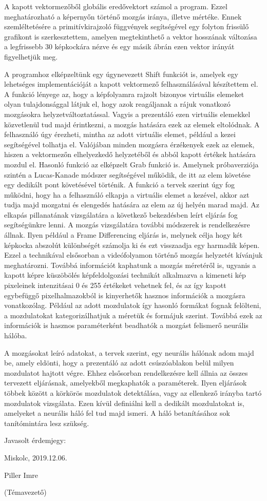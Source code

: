 \documentclass[a4paper]{article}
\begin{document}
A kapott vektormezőből globális eredővektort számol a program. Ezzel meghatározható a képernyőn történő mozgás iránya, illetve mértéke. Ennek szemléltetésére a primitívkirajzoló függvények segítségével egy folyton frissülő grafikont is szerkesztettem, amelyen megtekinthető a vektor hosszának változása a legfrissebb 30 képkockára nézve és egy másik ábrán ezen vektor irányát figyelhetjük meg.

A programhoz elképzeltünk egy úgynevezett Shift funkciót is, amelyek egy lehetséges implementációját a kapott vektormező felhasználásával készítettem el. A funkció lényege az, hogy a képfolyamra rajzolt bizonyos virtuális elemeket olyan tulajdonsággal látjuk el, hogy azok reagáljanak a rájuk vonatkozó mozgásokra helyzetváltoztatással. Vagyis a prezentáló ezen virtuális elemekkel közvetlenül tud majd érintkezni, a mozgás hatására ezek az elemek eltolódnak. A felhasználó úgy érezheti, mintha az adott virtuális elemet, például a kezei segítségével tolhatja el. Valójában minden mozgásra érzékenyek ezek az elemek, hiszen a vektormezőn elhelyezkedő helyzetéből és abból kapott értékek hatására mozdul el.
Hasonló funkció az elképzelt Grab funkció is. Amelynek próbaverziója szintén a Lucas-Kanade módszer segítségével működik, de itt az elem követése egy dedikált pont követésével történik. A funkció a tervek szerint úgy fog működni, hogy ha a felhasználó elkapja a virtuális elemet a kezével, akkor azt tudja majd mozgatni és elengedés hatására az elem az új helyén marad majd. Az elkapás pillanatának vizsgálatára a következő bekezdésben leírt eljárás fog segítségünkre lenni. 
A mozgás vizsgálatára további módszerek is rendelkezésre állnak. Ilyen például a Frame Differencing eljárás is, melynek célja hogy két képkocka abszolút különbségét számolja ki és ezt visszaadja egy harmadik képen. Ezzel a technikával elsősorban a videófolyamon történő mozgás helyzetét kívánjuk meghatározni. Továbbá információt kaphatunk a mozgás méretéről is, ugyanis a kapott képre küszöbölés képfeldolgozási technikát alkalmazva a kimeneti kép pixeleinek intenzitásai 0 és 255 értékeket vehetnek fel, és az így kapott egybefüggő pixelhalmazokból is kinyerhetők hasznos információk a mozgásra vonatkozólag. Például az adott mozdulatok így hasonló formákat fognak felölteni, a mozdulatokat kategorizálhatjuk a méretük és formájuk szerint. Továbbá ezek az információk is hasznos paraméterként beadhatók a mozgást felismerő neurális hálóba.

A mozgásokat leíró adatokat, a tervek szerint, egy neurális hálónak adom majd be, amely eldönti, hogy a prezentáló az adott csúszóablakon belül milyen mozdulatot hajtott végre. Ehhez elsősorban rendelkezésre kell állnia az összes tervezett eljárásnak, amelyekből megkaphatók a paraméterek. Ilyen eljárások többek között a körkörös mozdulatok detektálása, vagy az ellenkező irányba tartó mozdulatok vizsgálata. Ezen kívül definiálni kell a dedikált mozdulatokat is, amelyeket a neurális háló fel tud majd ismeri. A háló betanításához sok tanítómintára lesz szükség.

\vskip 3cm

\noindent Javasolt érdemjegy:

\vskip 1cm

\noindent Miskolc, 2019.12.06.


\hskip 11.3cm Piller Imre

\hskip 11cm (Témavezető)
\end{document}

